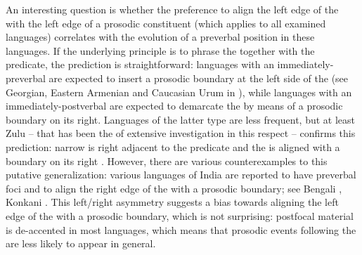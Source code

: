 \documentclass[output=paper,colorlinks,citecolor=brown]{langscibook}
\begin{document}
An interesting question is whether the preference to align the left edge of the  with the left edge of a prosodic constituent (which applies to all examined languages) correlates with the evolution of a preverbal  position in these languages. If the underlying principle is to phrase the  together with the predicate, the prediction is straightforward: languages with an immediately-preverbal  are expected to insert a prosodic boundary at the left side of the  (see Georgian, Eastern Armenian and Caucasian Urum in ), while languages with an immediately-postverbal  are expected to demarcate the  by means of a prosodic boundary on its right. Languages of the latter type are less frequent, but at least Zulu -- that has been the  of extensive investigation in this respect -- confirms this prediction: narrow  is right adjacent to the predicate and the  is aligned with a boundary on its right \citep[]{cheng_against_2012}{}. However, there are various counterexamples to this putative generalization: various languages of India are reported to have preverbal foci and to align the right edge of the  with a prosodic boundary; see Bengali \citep[]{selkirk_bengali_2008}, Konkani \citep[709]{fery_focus_2013}. This left/right asymmetry suggests a bias towards aligning the left edge of the  with a prosodic boundary, which is not surprising: postfocal material is de-accented in most languages, which means that prosodic events following the  are less likely to appear in general.
\end{document}
